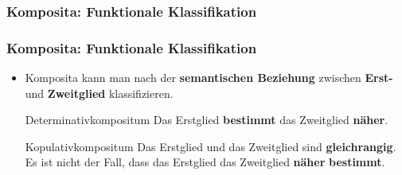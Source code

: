 \subsubsection{Komposita: Funktionale Klassifikation}


\begin{frame}
\frametitle{Komposita: Funktionale Klassifikation}

\begin{itemize}
	\item Komposita kann man nach der \textbf{semantischen Beziehung} zwischen \textbf{Erst-} und \textbf{Zweitglied} klassifizieren.
	
	\begin{block}{Determinativkompositum}
		Das Erstglied \textbf{bestimmt} das Zweitglied \textbf{näher}. 
	\end{block}
	
	\settowidth{}

	 
	
	\z 

\pause 
	
	\begin{block}{Kopulativkompositum}
		Das Erstglied und das Zweitglied sind \textbf{gleichrangig}.\\
		Es ist nicht der Fall, dass das Erstglied  das Zweitglied \textbf{näher} \textbf{bestimmt}. 
	\end{block}
	
	 
	\z 
	
\end{itemize}

\end{frame}



